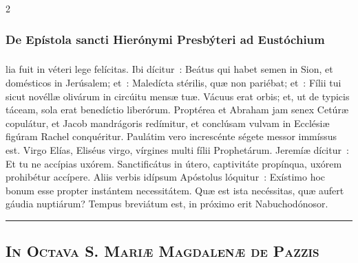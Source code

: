 \documentclass[9pt,twoside]{extarticle}
\begin{document}
\begin{multicols}{2}
\subsubsection*{\center {}}
\subsubsection*{\center De Epístola sancti Hierónymi Presbýteri ad Eustóchium}
\subsubsection*{\center {}}
lia fuit in véteri lege felícitas. Ibi dícitur~: Beátus qui habet semen in Sion, et domésticos in Jerúsalem; et~: Maledícta stérilis, quæ non pariébat; et~: Fílii tui sicut novéllæ olivárum in circúitu mensæ tuæ. Vácuus erat orbis; et, ut de typicis táceam, sola erat benedíctio liberórum. Proptérea et Abraham jam senex Cetúræ copulátur, et Jacob mandrágoris redímitur, et conclúsam vulvam in Ecclésiæ figúram Rachel conquéritur. Paulátim vero increscénte ségete messor immíssus est. Virgo Elías, Eliséus virgo, vírgines multi fílii Prophetárum. Jeremíæ dícitur~: Et tu ne accípias uxórem. Sanctificátus in útero, captivitáte propínqua, uxórem prohibétur accípere. Aliis verbis idípsum Apóstolus lóquitur~: Exístimo hoc bonum esse propter instántem necessitátem. Quæ est ista necéssitas, quæ aufert gáudia nuptiárum? Tempus breviátum est, in próximo erit Nabuchodónosor.

\begin{tightlist}{}
\item {} 
\item {}
\end{tightlist}

\begin{center}\textcolor{red}{\rule{\linewidth}{0.5pt}} \end{center}

\subsection*{\center {}}
\subsection*{\center \textsc{In Octava S. Mariæ Magdalenæ de Pazzis}}

\end{multicols}
\end{document}
